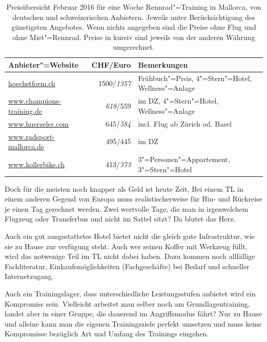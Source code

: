 \documentclass[a4paper,DIV13,BCOR0cm,draft=TRUE]{scrartcl}
\begin{document}
\begin{table}
  \centering
  \begin{tabular}{lrl}
    \toprule
        Anbieter"=Website & CHF/Euro & Bemerkungen \\
    \midrule
        \url{hoechstform.ch} & 1500/\textsl{1357} & Frühbuch"=Preis, 4"=Stern"=Hotel, Wellness"=Anlage \\
        \url{www.champions-training.de} & \textsl{618}/559 & im DZ, 4"=Stern"=Hotel, Wellness"=Anlage \\
        \url{www.huerzeler.com} & 645/\textsl{584} & incl. Flug ab Zürich od. Basel\\
        \url{www.radsport-mallorca.de} & 495/445 & im DZ \\
        \url{www.kollerbike.ch} & 413/\textsl{373} & 3"=Personen"=Appartement, 3"=Stern"=Hotel \\
    \bottomrule
  \end{tabular}
  \caption{Preisübersicht Februar 2016 für eine Woche Rennrad"=Training in Mallorca,
    von deutschen und schweizerischen Anbietern.
    Jeweils unter Berücksichtigung des günstigsten Angebotes.
    Wenn nichts angegeben sind die Preise ohne Flug und ohne Miet"=Rennrad.
  Preise in kursiv sind jeweils von der anderen Währung umgerechnet.}
  \label{tab:preisvergleich}
\end{table}


Doch für die meisten noch knapper als Geld ist heute Zeit.
Bei einem TL in einem anderen Gegend von Europa muss realistischerweise für Hin- und Rückreise je einen Tag gerechnet werden.
Zwei wertvolle Tage, die man in irgenwelchem Flugzeug oder Transferbus und nicht im Sattel sitzt?
Da blutet das Herz.

Auch ein gut ausgestattetes Hotel bietet nicht die gleich gute Infrastruktur, wie sie zu Hause zur verfügung steht.
Auch wer seinen Koffer mit Werkzeug füllt, wird das notwenige Teil im TL nicht dabei haben.
Dazu kommen noch allfällige Fachliteratur, Einkaufsmöglichkeiten (Fachgeschäfte) bei Bedarf und schneller Internetzugang.

Auch ein Trainingslager, dass unterschiedliche Leistungsstufen anbietet wird ein Kompromiss sein.
Vielleicht arbeitet man selber noch am Grundlagentraining, landet aber in einer Gruppe, die dauerend im Angriffsmodus fährt?
Nur zu Hause und alleine kann man die eigenen Trainingsziele perfekt umsetzen und muss keine Kompromisse bezüglich Art und Umfang des Trainings eingehen.
\end{document}
